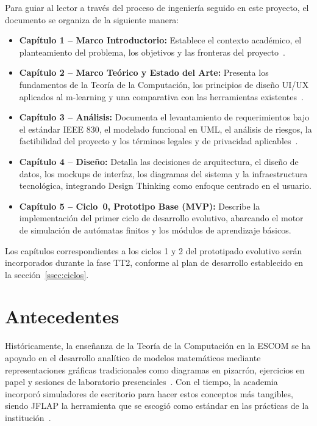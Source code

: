 Para guiar al lector a través del proceso de ingeniería seguido en este proyecto, el documento
se organiza de la siguiente manera:

\begin{itemize}
    \item \textbf{Capítulo 1 -- Marco Introductorio:} Establece el contexto académico, el
        planteamiento del problema, los objetivos y las fronteras del
        proyecto~\cite{ipn2020, escom2016}.

    \item \textbf{Capítulo 2 -- Marco Teórico y Estado del Arte:} Presenta los fundamentos de
        la Teoría de la Computación, los principios de diseño UI/UX aplicados al m-learning y
        una comparativa con las herramientas existentes~\cite{sinchi2018, crompton2018}.

    \item \textbf{Capítulo 3 -- Análisis:} Documenta el levantamiento de requerimientos bajo
        el estándar IEEE 830, el modelado funcional en UML, el análisis de riesgos, la
        factibilidad del proyecto y los términos legales y de privacidad
        aplicables~\cite{ieee1998}.

    \item \textbf{Capítulo 4 -- Diseño:} Detalla las decisiones de arquitectura, el diseño
        de datos, los mockups de interfaz, los diagramas del sistema y la infraestructura
        tecnológica, integrando Design Thinking como enfoque centrado en el usuario.

    \item \textbf{Capítulo 5 -- Ciclo~0, Prototipo Base (MVP):} Describe la implementación
        del primer ciclo de desarrollo evolutivo, abarcando el motor de simulación de autómatas
        finitos y los módulos de aprendizaje básicos.
\end{itemize}

Los capítulos correspondientes a los ciclos 1 y 2 del prototipado evolutivo serán incorporados
durante la fase TT2, conforme al plan de desarrollo establecido en la
sección~\ref{ssec:ciclos}.

\section{Antecedentes}
\label{sec:antecedentes}

Históricamente, la enseñanza de la Teoría de la Computación en la ESCOM se ha apoyado en el
desarrollo analítico de modelos matemáticos mediante representaciones gráficas tradicionales
como diagramas en pizarrón, ejercicios en papel y sesiones de laboratorio
presenciales~\cite{ipn2020}. Con el tiempo, la academia incorporó simuladores de escritorio
para hacer estos conceptos más tangibles, siendo JFLAP la herramienta que se escogió como
estándar en las prácticas de la institución~\cite{rodger2006}.


